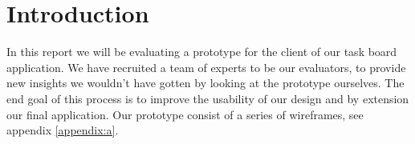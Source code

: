 \section{Introduction}
In this report we will be evaluating a prototype for the client of our task board application. We have recruited a team of experts to be our evaluators, to provide new insights we wouldn't have gotten by looking at the prototype ourselves. The end goal of this process is to improve the usability of our design and by extension our final application.
\newline
Our prototype consist of a series of wireframes, see appendix \ref{appendix:a}.




